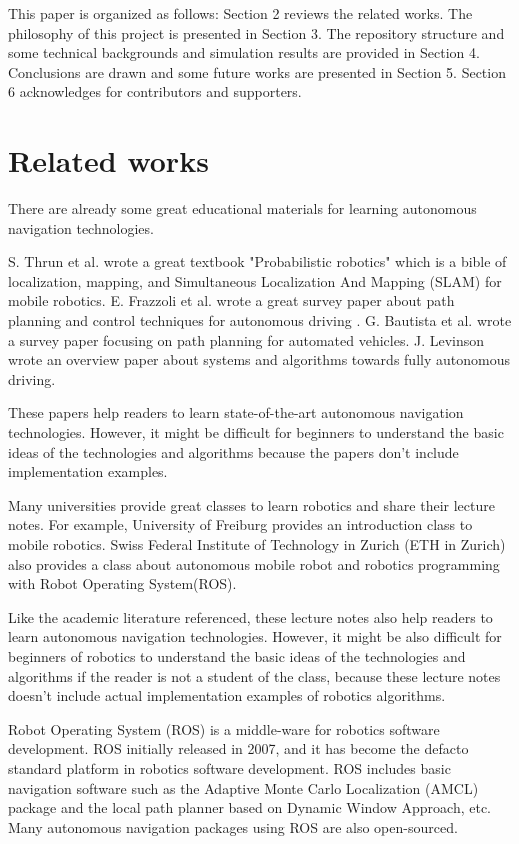 \documentclass{bmvc2k}
\begin{document}
This paper is organized as follows: Section 2 reviews the related works. The philosophy of this project is presented in Section 3.
The repository structure and some technical backgrounds and simulation results are provided in Section 4.
Conclusions are drawn and some future works are presented in Section 5. 
Section 6 acknowledges for contributors and supporters. 


\section{Related works}

There are already some great educational materials for learning autonomous navigation technologies.

S. Thrun et al. wrote a great textbook "Probabilistic robotics" which is a bible of localization, mapping, and Simultaneous Localization And Mapping (SLAM) for mobile robotics\cite{PR}.
E. Frazzoli et al. wrote a great survey paper about path planning and control techniques for autonomous driving \cite{pathtracking}.
G. Bautista et al. wrote a survey paper focusing on path planning for automated vehicles\cite{pathplanning}.
J. Levinson wrote an overview paper about systems and algorithms towards fully autonomous driving\cite{Levinson2011}.

These papers help readers to learn state-of-the-art autonomous navigation technologies.
However, it might be difficult for beginners to understand the basic ideas of the technologies and algorithms because the papers don't include implementation examples.

Many universities provide great classes to learn robotics and share their lecture notes.
For example, University of Freiburg provides an introduction class to mobile robotics\cite{course1}.
Swiss Federal Institute of Technology in Zurich (ETH in Zurich) also provides a class about autonomous mobile robot\cite{course2} and robotics programming with Robot Operating System(ROS)\cite{course3}.

Like the academic literature referenced, these lecture notes also help readers to learn autonomous navigation technologies.
However, it might be also difficult for beginners of robotics to understand the basic ideas of the technologies and algorithms if the reader is not a student of the class, because these lecture notes doesn't include actual implementation examples of robotics algorithms.

Robot Operating System (ROS) is a middle-ware for robotics software development\cite{ros}\cite{rospaper}.
ROS initially released in 2007, and it has become the defacto standard platform in robotics software development.
ROS includes basic navigation software such as the Adaptive Monte Carlo Localization (AMCL) package and the local path planner based on Dynamic Window Approach, etc\cite{rosnavigation}.
Many autonomous navigation packages using ROS are also open-sourced.
\end{document}
